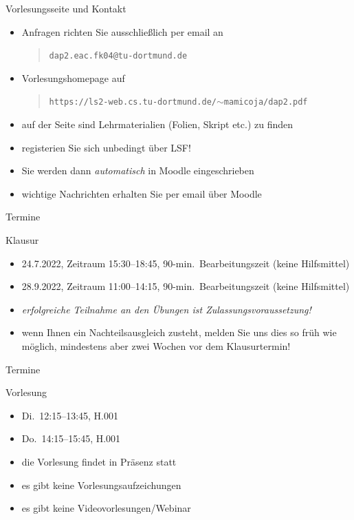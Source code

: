 \documentclass[aspectratio=1610, 11pt]{beamer}
\begin{document}
\begin{frame}{Vorlesungsseite und Kontakt}
	\begin{exampleblock}{}
		\begin{itemize}
			\item Anfragen richten Sie ausschlie\ss lich per email an
				\begin{quote}
\tt dap2.eac.fk04@tu-dortmund.de
				\end{quote}
			\item Vorlesungshomepage auf
				\begin{quote}
\tt https://ls2-web.cs.tu-dortmund.de/$\sim$mamicoja/dap2.pdf
				\end{quote}
			\item auf der Seite sind Lehrmaterialien (Folien, Skript etc.) zu finden
			\item registerien Sie sich \alert{unbedingt} \"uber LSF!
			\item Sie werden dann \emph{automatisch} in \alert{Moodle} eingeschrieben
			\item wichtige Nachrichten erhalten Sie per email \"uber Moodle
		\end{itemize}
	\end{exampleblock}
\end{frame}


\begin{frame}{Termine}
	\begin{exampleblock}{Klausur}
		\begin{itemize}
			\item 24.7.2022, Zeitraum 15:30--18:45, 90-min.\ Bearbeitungszeit (keine Hilfsmittel)
			\item 28.9.2022, Zeitraum 11:00--14:15, 90-min.\ Bearbeitungszeit (keine Hilfsmittel)
			\item \emph{erfolgreiche Teilnahme an den \"Ubungen ist Zulassungsvoraussetzung!}
			\item wenn Ihnen ein Nachteilsausgleich zusteht, melden Sie uns dies so fr\"uh wie m\"oglich, mindestens aber zwei Wochen vor dem Klausurtermin!
		\end{itemize}
	\end{exampleblock}
\end{frame}

\begin{frame}{Termine}
	\begin{exampleblock}{Vorlesung}
		\begin{itemize}
			\item Di.\ 12:15--13:45, H.001
			\item Do.\ 14:15--15:45, H.001
			\item die Vorlesung findet in Pr\"asenz statt
			\item es gibt keine Vorlesungsaufzeichungen
			\item es gibt keine Videovorlesungen/Webinar
		\end{itemize}
	\end{exampleblock}
\end{frame}
\end{document}
